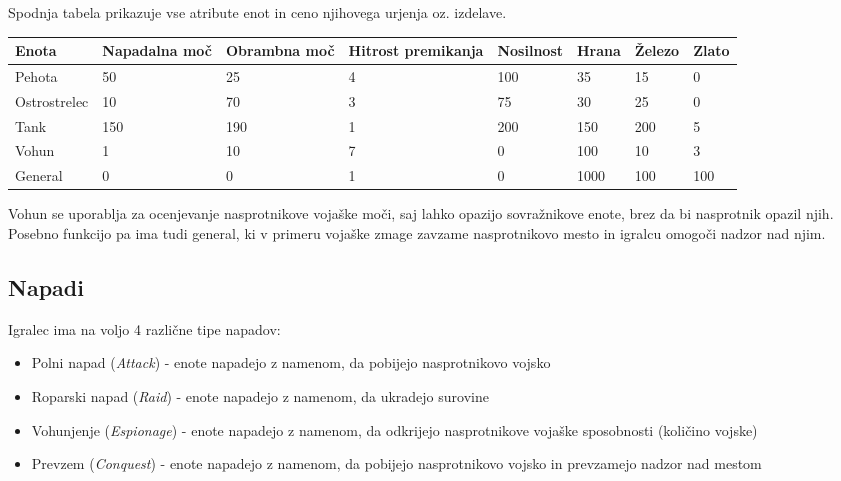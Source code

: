 \documentclass[a4paper, 16pt]{article}
\begin{document}
Spodnja tabela prikazuje vse atribute enot in ceno njihovega urjenja oz. izdelave.

\begin{table}[]
    \begin{tabular}{l|llll|lll}
    Enota        & Napadalna moč & Obrambna moč & Hitrost premikanja & Nosilnost & Hrana & Železo & Zlato \\ \hline
    Pehota       & 50            & 25           & 4                  & 100       & 35    & 15     & 0     \\
    Ostrostrelec & 10            & 70           & 3                  & 75        & 30    & 25     & 0     \\
    Tank         & 150           & 190          & 1                  & 200       & 150   & 200    & 5     \\
    Vohun        & 1             & 10           & 7                  & 0         & 100   & 10     & 3     \\
    General      & 0             & 0            & 1                  & 0         & 1000  & 100    & 100  
    \end{tabular}
\end{table}

Vohun se uporablja za ocenjevanje nasprotnikove vojaške moči, saj lahko opazijo sovražnikove enote, brez da bi nasprotnik opazil njih.
Posebno funkcijo pa ima tudi general, ki v primeru vojaške zmage zavzame nasprotnikovo mesto in igralcu omogoči nadzor nad njim.

\subsection{Napadi}

Igralec ima na voljo 4 različne tipe napadov:

\begin{itemize}
    \item Polni napad (\textit{Attack}) - enote napadejo z namenom, da pobijejo nasprotnikovo vojsko
    \item Roparski napad (\textit{Raid}) - enote napadejo z namenom, da ukradejo surovine
    \item Vohunjenje (\textit{Espionage}) - enote napadejo z namenom, da odkrijejo nasprotnikove vojaške sposobnosti (količino vojske)
    \item Prevzem (\textit{Conquest}) - enote napadejo z namenom, da pobijejo nasprotnikovo vojsko in prevzamejo nadzor nad mestom
\end{itemize}
\end{document}
